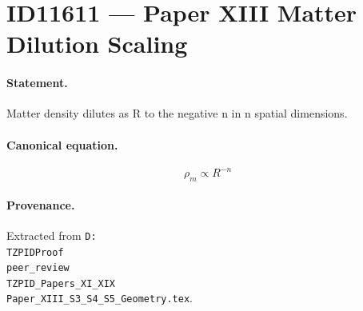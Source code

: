 \section*{ID11611 --- Paper XIII Matter Dilution Scaling}

\paragraph{Statement.}
Matter density dilutes as R to the negative n in n spatial dimensions.

\paragraph{Canonical equation.}
\[
\rho_m\propto R^{-n}
\]

\paragraph{Provenance.}
Extracted from \texttt{D:\\TZPIDProof\\peer\_review\\TZPID\_Papers\_XI\_XIX\\Paper\_XIII\_S3\_S4\_S5\_Geometry.tex}.
